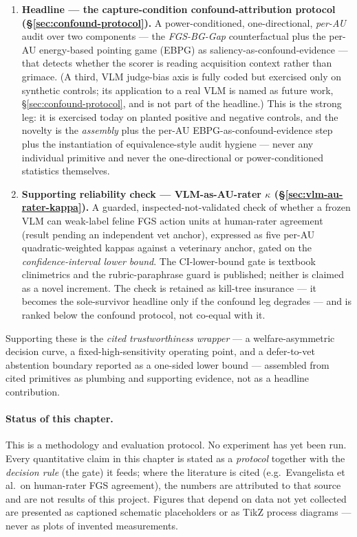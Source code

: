 \begin{enumerate}
  \item \textbf{Headline --- the capture-condition confound-attribution
  protocol (\S\ref{sec:confound-protocol}).} A power-conditioned,
  one-directional, \emph{per-AU} audit over two components --- the
  \emph{FGS-BG-Gap} counterfactual plus the per-AU energy-based pointing game
  (EBPG) as saliency-as-confound-evidence --- that detects whether the scorer is
  reading acquisition context rather than grimace. (A third, VLM judge-bias axis
  is fully coded but exercised only on synthetic controls; its application to a
  real VLM is named as future work, \S\ref{sec:confound-protocol}, and is not
  part of the headline.) This is the strong leg: it is
  exercised today on planted positive and negative controls, and the novelty is
  the \emph{assembly} plus the per-AU EBPG-as-confound-evidence step plus the
  instantiation of equivalence-style audit hygiene --- never any individual
  primitive and never the one-directional or power-conditioned statistics
  themselves.
  \item \textbf{Supporting reliability check --- VLM-as-AU-rater $\kappa$
  (\S\ref{sec:vlm-au-rater-kappa}).} A guarded, inspected-not-validated check of
  whether a frozen VLM can weak-label feline FGS action units at human-rater
  agreement (result pending an independent vet anchor), expressed as five per-AU
  quadratic-weighted kappas against a veterinary anchor, gated on the
  \emph{confidence-interval lower bound}. The CI-lower-bound gate is textbook
  clinimetrics and the rubric-paraphrase guard is published; neither is claimed
  as a novel increment. The check is retained as kill-tree insurance --- it
  becomes the sole-survivor headline only if the confound leg degrades --- and
  is ranked below the confound protocol, not co-equal with it.
\end{enumerate}

Supporting these is the \emph{cited trustworthiness wrapper} --- a
welfare-asymmetric decision curve, a fixed-high-sensitivity operating point, and
a defer-to-vet abstention boundary reported as a one-sided lower bound ---
assembled from cited primitives as plumbing and supporting evidence, not as a
headline contribution.

\paragraph{Status of this chapter.} This is a methodology and evaluation
protocol. No experiment has yet been run. Every quantitative claim in this
chapter is stated as a \emph{protocol} together with the \emph{decision rule}
(the gate) it feeds; where the literature is cited (e.g.\ Evangelista et al.\ on
human-rater FGS agreement), the numbers are attributed to that source and are
not results of this project. Figures that depend on data not yet collected are
presented as captioned schematic placeholders or as TikZ process diagrams ---
never as plots of invented measurements.

